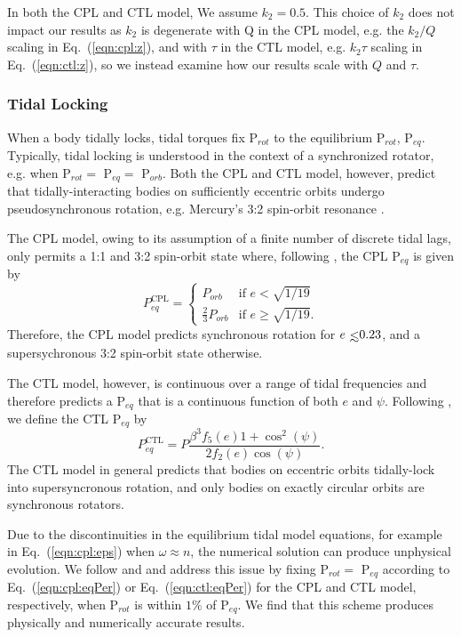 \documentclass[twocolumn]{aastex61}
\def\lsim{~\rlap{$<$}{\lower 1.0ex\hbox{$\sim$}}}
\begin{document}
In both the CPL and CTL model, We assume $k_2 = 0.5$. This choice of $k_2$ does not impact our results as $k_2$ is degenerate with Q in the CPL model, e.g. the $k_2/Q$ scaling in Eq.~(\ref{eqn:cpl:z}), and with $\tau$ in the CTL model, e.g. $k_2 \tau$ scaling in Eq.~(\ref{eqn:ctl:z}), so we instead examine how our results scale with $Q$ and $\tau$.

\subsubsection{Tidal Locking}

When a body tidally locks, tidal torques fix P$_{rot}$ to the equilibrium P$_{rot}$, P$_{eq}$.  Typically, tidal locking is understood in the context of a synchronized rotator, e.g. when P$_{rot} = $ P$_{eq} = $ P$_{orb}$. Both the CPL and CTL model, however, predict that tidally-interacting bodies on sufficiently eccentric orbits undergo pseudosynchronous rotation, e.g. Mercury's 3:2 spin-orbit resonance \citep[P$_{rot} = 2/3$ P$_{orb}$,][]{GoldreichPeale1966}.

The CPL model, owing to its assumption of a finite number of discrete tidal lags, only permits a 1:1 and 3:2 spin-orbit state where, following \citet{Barnes2017}, the CPL P$_{eq}$ is given by
\begin{equation} \label{eqn:cpl:eqPer}
P^{\mathrm{CPL}}_{eq} = 
\begin{cases}
P_{orb} & \text{if } e < \sqrt{1/19}\\
\frac{2}{3}P_{orb} & \text{if } e \geq \sqrt{1/19}.
\end{cases}
\end{equation}
Therefore, the CPL model predicts synchronous rotation for $e \lsim 0.23$, and a supersychronous 3:2 spin-orbit state otherwise.

The CTL model, however, is continuous over a range of tidal frequencies and therefore predicts a P$_{eq}$ that is a continuous function of both $e$ and $\psi$.  Following \citet{Barnes2017}, we define the CTL P$_{eq}$ by
\begin{equation} \label{eqn:ctl:eqPer}
P^{\mathrm{CTL}}_{eq} = P\frac{\beta^3 f_5(e) 1 + \cos^2(\psi)}{2f_2(e) \cos(\psi)}.
\end{equation}
The CTL model in general predicts that bodies on eccentric orbits tidally-lock into supersyncronous rotation, and only bodies on exactly circular orbits are synchronous rotators. 

Due to the discontinuities in the equilibrium tidal model equations, for example in Eq.~(\ref{eqn:cpl:eps}) when $\omega \approx n$, the numerical solution can produce unphysical evolution. We follow \citet{Barnes2013} and \citet{Fleming2018} and address this issue by fixing P$_{rot} = $ P$_{eq}$ according to Eq.~(\ref{eqn:cpl:eqPer}) or Eq.~(\ref{eqn:ctl:eqPer}) for the CPL and CTL model, respectively, when P$_{rot}$ is within $1\%$ of P$_{eq}$. We find that this scheme produces physically and numerically accurate results. 
\end{document}

